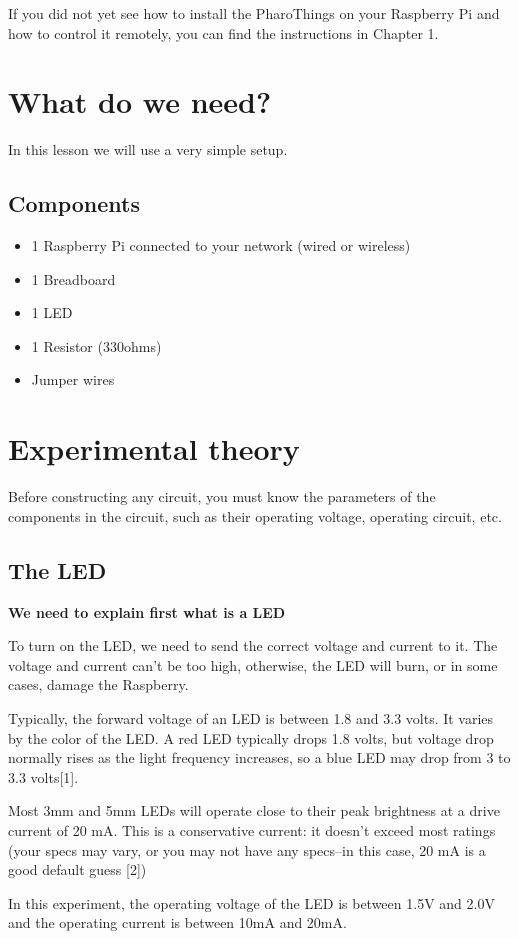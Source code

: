 \documentclass[10pt,twoside,english]{_support/latex/sbabook/sbabook}
\begin{document}
If you did not yet see how to install the PharoThings on your Raspberry Pi and how to control it remotely, you can find the instructions in Chapter 1.
\section{What do we need?}
In this lesson we will use a very simple setup.
\subsection{Components}
\begin{itemize}
\item 1 Raspberry Pi connected to your network (wired or wireless)
\item 1 Breadboard
\item 1 LED
\item 1 Resistor (330ohms)
\item Jumper wires
\end{itemize}
\section{Experimental theory}
Before constructing any circuit, you must know the parameters of the components in the circuit, such as their operating voltage, operating circuit, etc.
\subsection{The LED}
\textbf{We need to explain first what is a LED}

To turn on the LED, we need to send the correct voltage and current to it. The voltage and current can’t be too high, otherwise, the LED will burn, or in some cases, damage the Raspberry.

Typically, the forward voltage of an LED is between 1.8 and 3.3 volts. It varies by the color of the LED. A red LED typically drops 1.8 volts, but voltage drop normally rises as the light frequency increases, so a blue LED may drop from 3 to 3.3 volts{[}1{]}.

Most 3mm and 5mm LEDs will operate close to their peak brightness at a drive current of 20 mA. This is a conservative current: it doesn’t exceed most ratings (your specs may vary, or you may not have any specs–in this case, 20 mA is a good default guess {[}2{]})

In this experiment, the operating voltage of the LED is between 1.5V and 2.0V and the operating current is between 10mA and 20mA.
\end{document}
